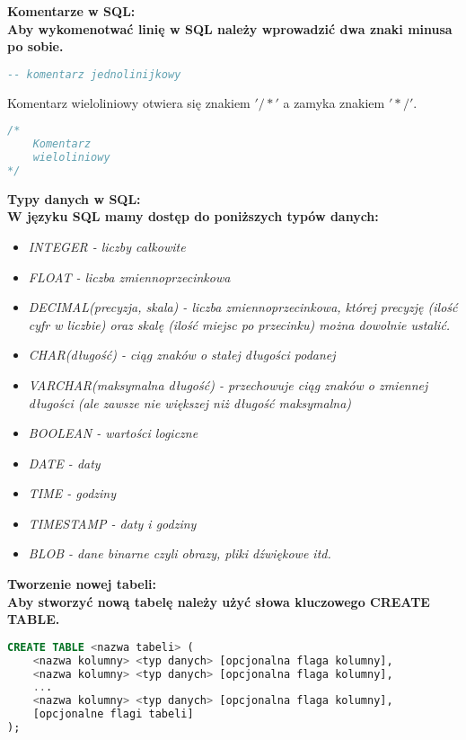 \documentclass[a4paper,12pt]{article}
\newcommand{\h}[1]{\noindent \bf #1 \rm \\ \noindent}
\newcommand{\italic}[1]{\it #1 \rm}
\begin{document}
\h{Komentarze w SQL:}
Aby wykomenotwać linię w SQL należy wprowadzić dwa znaki minusa po sobie.
\begin{lstlisting}[language=SQL]
-- komentarz jednolinijkowy
\end{lstlisting}
\vspace{5mm}

\noindent
Komentarz wieloliniowy otwiera się znakiem $'/*'$ a zamyka znakiem $'*/'$.
\begin{lstlisting}[language=SQL]
/* 
	Komentarz
	wieloliniowy
*/
\end{lstlisting}
\vspace{5mm}

\h{Typy danych w SQL:}
W języku SQL mamy dostęp do poniższych typów danych:
\begin{itemize}
	\item \italic{INTEGER} - liczby całkowite
	\item \italic{FLOAT} - liczba zmiennoprzecinkowa
	\item \italic{DECIMAL(precyzja, skala)} - liczba zmiennoprzecinkowa, której precyzję (ilość cyfr w liczbie) oraz skalę (ilość miejsc po przecinku) można dowolnie ustalić.
	\item \italic{CHAR(długość)} - ciąg znaków o stałej długości podanej 
	\item \italic{VARCHAR(maksymalna długość)} - przechowuje ciąg znaków o zmiennej długości (ale zawsze nie większej niż długość maksymalna)
	\item \italic{BOOLEAN} - wartości logiczne
	\item \italic{DATE} - daty
	\item \italic{TIME} - godziny
	\item \italic{TIMESTAMP} - daty i godziny
	\item \italic{BLOB} - dane binarne czyli obrazy, pliki dźwiękowe itd. 
\end{itemize} 
\vspace{5mm}

\h{Tworzenie nowej tabeli:}
Aby stworzyć nową tabelę należy użyć słowa kluczowego CREATE TABLE.

\begin{lstlisting}[language=SQL]
CREATE TABLE <nazwa tabeli> (
	<nazwa kolumny> <typ danych> [opcjonalna flaga kolumny],
	<nazwa kolumny> <typ danych> [opcjonalna flaga kolumny],
	...
	<nazwa kolumny> <typ danych> [opcjonalna flaga kolumny],
	[opcjonalne flagi tabeli]
);
\end{lstlisting}
\vspace{5mm}
\end{document}
